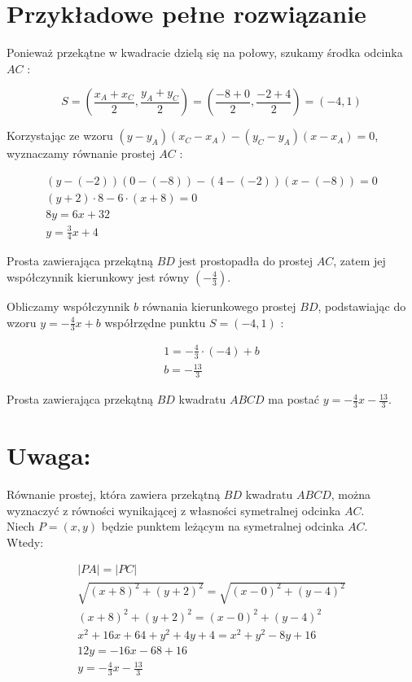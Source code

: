 \documentclass[10pt]{article}
\begin{document}
\section*{Przykładowe pełne rozwiązanie}
Ponieważ przekątne w kwadracie dzielą się na połowy, szukamy środka odcinka $A C$ :

$$
S=\left(\frac{x_{A}+x_{C}}{2}, \frac{y_{A}+y_{C}}{2}\right)=\left(\frac{-8+0}{2}, \frac{-2+4}{2}\right)=(-4,1)
$$

Korzystając ze wzoru $\left(y-y_{A}\right)\left(x_{C}-x_{A}\right)-\left(y_{C}-y_{A}\right)\left(x-x_{A}\right)=0$, wyznaczamy równanie prostej $A C$ :

$$
\begin{gathered}
(y-(-2))(0-(-8))-(4-(-2))(x-(-8))=0 \\
(y+2) \cdot 8-6 \cdot(x+8)=0 \\
8 y=6 x+32 \\
y=\frac{3}{4} x+4
\end{gathered}
$$

Prosta zawierająca przekątną $B D$ jest prostopadła do prostej $A C$, zatem jej współczynnik kierunkowy jest równy $\left(-\frac{4}{3}\right)$.

Obliczamy współczynnik $b$ równania kierunkowego prostej $B D$, podstawiając do wzoru $y=-\frac{4}{3} x+b$ współrzędne punktu $S=(-4,1)$ :

$$
\begin{gathered}
1=-\frac{4}{3} \cdot(-4)+b \\
b=-\frac{13}{3}
\end{gathered}
$$

Prosta zawierająca przekątną $B D$ kwadratu $A B C D$ ma postać $y=-\frac{4}{3} x-\frac{13}{3}$.

\section*{Uwaga:}
Równanie prostej, która zawiera przekątną $B D$ kwadratu $A B C D$, można wyznaczyć z równości wynikającej z własności symetralnej odcinka $A C$.\\
Niech $P=(x, y)$ będzie punktem leżącym na symetralnej odcinka $A C$.\\
Wtedy:

$$
\begin{gathered}
|P A|=|P C| \\
\sqrt{(x+8)^{2}+(y+2)^{2}}=\sqrt{(x-0)^{2}+(y-4)^{2}} \\
(x+8)^{2}+(y+2)^{2}=(x-0)^{2}+(y-4)^{2} \\
x^{2}+16 x+64+y^{2}+4 y+4=x^{2}+y^{2}-8 y+16 \\
12 y=-16 x-68+16 \\
y=-\frac{4}{3} x-\frac{13}{3}
\end{gathered}
$$
\end{document}
